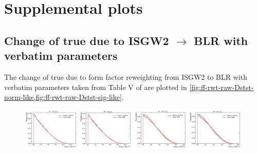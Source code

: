 \chapter{Supplemental plots}

\section{Change of true \qSq due to ISGW2 $\rightarrow$ BLR with verbatim
parameters}

The change of true \qSq due to form factor reweighting from ISGW2 to
BLR with verbatim parameters taken from Table V of \cite{Bernlochner_2018}
are plotted in
\cref{fig:ff-rwt-raw-Dstst-norm-like,fig:ff-rwt-raw-Dstst-sig-like}.

\begin{figure}[ht]
    \centering
    \includegraphics[width=0.24\textwidth]{
        ./figs-supplemental-plots/Dstst-form-factors/DststMu/D0stst0Mu.pdf
    }
    \includegraphics[width=0.24\textwidth]{
        ./figs-supplemental-plots/Dstst-form-factors/DststMu/D0ststMu.pdf
    }
    \includegraphics[width=0.24\textwidth]{
        ./figs-supplemental-plots/Dstst-form-factors/DststMu/D1pstst0Mu.pdf
    }
    \includegraphics[width=0.24\textwidth]{
        ./figs-supplemental-plots/Dstst-form-factors/DststMu/D1pststMu.pdf
    }


\end{figure}
